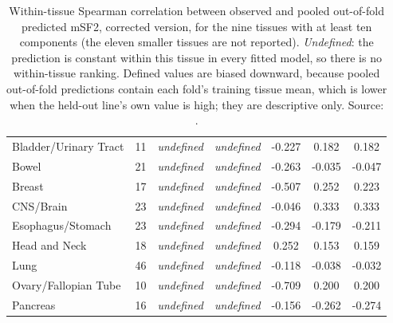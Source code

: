\begin{table}[htbp]
  \caption[Within-tissue Spearman correlation (corrected version)]{Within-tissue Spearman
    correlation between observed and pooled out-of-fold predicted mSF2, corrected version,
    for the nine tissues with at least ten components (the eleven smaller tissues are not
    reported). \emph{Undefined}: the prediction is constant within this tissue in every
    fitted model, so there is no within-tissue ranking. Defined values are biased downward,
    because pooled out-of-fold predictions contain each fold's training tissue mean, which is
    lower when the held-out line's own value is high; they are descriptive only. Source:
    .}
  \label{tab:s4}
  \small
  \begin{tabular}{@{}l S[table-format=2.0] c c S[table-format=-1.3] S[table-format=-1.3]
      S[table-format=-1.3]@{}}
    \toprule
     & {} &  &  & {}
      & {} & {} \\
    \midrule
    Bladder/Urinary Tract & 11 & \textit{undefined} & \textit{undefined} & -0.227 & 0.182 & 0.182 \\
    Bowel & 21 & \textit{undefined} & \textit{undefined} & -0.263 & -0.035 & -0.047 \\
    Breast & 17 & \textit{undefined} & \textit{undefined} & -0.507 & 0.252 & 0.223 \\
    CNS/Brain & 23 & \textit{undefined} & \textit{undefined} & -0.046 & 0.333 & 0.333 \\
    Esophagus/Stomach & 23 & \textit{undefined} & \textit{undefined} & -0.294 & -0.179 & -0.211 \\
    Head and Neck & 18 & \textit{undefined} & \textit{undefined} & 0.252 & 0.153 & 0.159 \\
    Lung & 46 & \textit{undefined} & \textit{undefined} & -0.118 & -0.038 & -0.032 \\
    Ovary/Fallopian Tube & 10 & \textit{undefined} & \textit{undefined} & -0.709 & 0.200 & 0.200 \\
    Pancreas & 16 & \textit{undefined} & \textit{undefined} & -0.156 & -0.262 & -0.274 \\
    \bottomrule
  \end{tabular}
\end{table}

